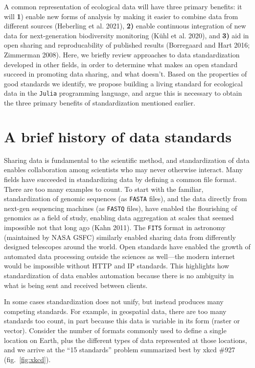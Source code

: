 \documentclass[10pt,oneside]{article}
\begin{document}
A common representation of ecological data will have three primary
benefits: it will \textbf{1}) enable new forms of analysis by making it
easier to combine data from different sources (Heberling et al. 2021),
\textbf{2)} enable continuous integration of new data for
next-generation biodiversity monitoring (Kühl et al. 2020), and
\textbf{3)} aid in open sharing and reproducability of published results
(Borregaard and Hart 2016; Zimmerman 2008). Here, we briefly review
approaches to data standardization developed in other fields, in order
to determine what makes an open standard succeed in promoting data
sharing, and what doesn't. Based on the properties of good standards we
identify, we propose building a living standard for ecological data in
the \texttt{Julia} programming language, and argue this is necessary to
obtain the three primary benefits of standardization mentioned earlier.

\hypertarget{a-brief-history-of-data-standards}{%
\section{A brief history of data
standards}\label{a-brief-history-of-data-standards}}

Sharing data is fundamental to the scientific method, and
standardization of data enables collaboration among scientists who may
never otherwise interact. Many fields have succeeded in standardizing
data by defining a common file format. There are too many examples to
count. To start with the familiar, standardization of genomic sequences
(as \texttt{FASTA} files), and the data directly from next-gen
sequencing machines (as \texttt{FASTQ} files), have enabled the
flourishing of genomics as a field of study, enabling data aggregation
at scales that seemed impossible not that long ago (Kahn 2011). The
\texttt{FITS} format in astronomy (maintained by NASA GSFC) similarly
enabled sharing data from differently designed telescopes around the
world. Open standards have enabled the growth of automated data
processing outside the sciences as well---the modern internet would be
impossible without HTTP and IP standards. This highlights how
standardization of data enables automation because there is no ambiguity
in what is being sent and received between clients.

In some cases standardization does not unify, but instead produces many
competing standards. For example, in geospatial data, there are too many
standards too count, in part because this data is variable in its form
(raster or vector). Consider the number of formats commonly used to
define a single location on Earth, plus the different types of data
represented at those locations, and we arrive at the ``15 standards''
problem summarized best by xkcd \#927 (fig.~\ref{fig:xkcd}).
\end{document}
